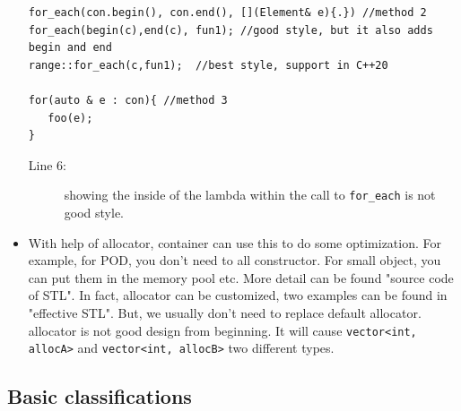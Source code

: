 \documentclass[a4paper,11pt,twoside]{book}
\begin{document}
\begin{itemize}
\begin{lstlisting}
for_each(con.begin(), con.end(), [](Element& e){.}) //method 2
for_each(begin(c),end(c), fun1); //good style, but it also adds begin and end
range::for_each(c,fun1);  //best style, support in C++20

for(auto & e : con){ //method 3
   foo(e);
}
\end{lstlisting}
\begin{description}
\item[Line 6:] showing the inside of the lambda within the call to \texttt{for\_each} is not good style.
\end{description}


	\item With help of allocator, container can use this to do some optimization. For example, for POD, you don't need to all constructor. For small object, you can put them in the memory pool etc.  More detail can be found "source code of STL". In fact, allocator can be customized, two examples can be found in "effective STL".  But, we usually don't need to replace default allocator. allocator is not good design from beginning. It will cause \texttt{vector<int, allocA>} and \texttt{vector<int, allocB>} two different types. 
\end{itemize}


\subsection{Basic classifications}
\end{document}
